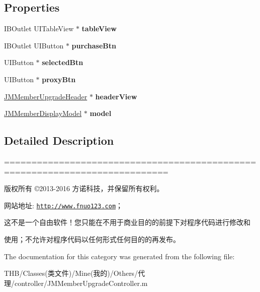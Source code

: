 \subsection*{Properties}
\begin{DoxyCompactItemize}
\item 
\mbox{\label{category_j_m_member_upgrade_controller_07_08_ab432d26629eb65a564624c96fb01f668}} 
I\+B\+Outlet U\+I\+Table\+View $\ast$ {\bfseries table\+View}
\item 
\mbox{\label{category_j_m_member_upgrade_controller_07_08_a675ec47f107f5c0157555d579a841243}} 
I\+B\+Outlet U\+I\+Button $\ast$ {\bfseries purchase\+Btn}
\item 
\mbox{\label{category_j_m_member_upgrade_controller_07_08_a3a04ef475fbcc35647fbb99a4bb5b232}} 
U\+I\+Button $\ast$ {\bfseries selected\+Btn}
\item 
\mbox{\label{category_j_m_member_upgrade_controller_07_08_abeeed2b18acf1f6533dfd48c0faef067}} 
U\+I\+Button $\ast$ {\bfseries proxy\+Btn}
\item 
\mbox{\label{category_j_m_member_upgrade_controller_07_08_af2d47c3b4ffccee807755c58344d8108}} 
\mbox{\hyperlink{interface_j_m_member_upgrade_header}{J\+M\+Member\+Upgrade\+Header}} $\ast$ {\bfseries header\+View}
\item 
\mbox{\label{category_j_m_member_upgrade_controller_07_08_a97bfa9adf14cc45af02667a0ee7c7dc9}} 
\mbox{\hyperlink{interface_j_m_member_display_model}{J\+M\+Member\+Display\+Model}} $\ast$ {\bfseries model}
\end{DoxyCompactItemize}


\subsection{Detailed Description}
============================================================================

版权所有 ©2013-\/2016 方诺科技，并保留所有权利。

网站地址\+: \href{http://www.fnuo123.com}{\tt http\+://www.\+fnuo123.\+com}； 



这不是一个自由软件！您只能在不用于商业目的的前提下对程序代码进行修改和

使用；不允许对程序代码以任何形式任何目的的再发布。 

 

The documentation for this category was generated from the following file\+:\begin{DoxyCompactItemize}
\item 
T\+H\+B/\+Classes(类文件)/\+Mine(我的)/\+Others/代理/controller/J\+M\+Member\+Upgrade\+Controller.\+m\end{DoxyCompactItemize}
